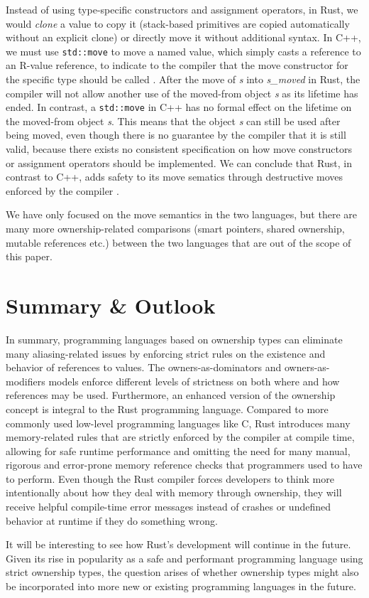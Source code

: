 \documentclass[sigplan,11pt,nonacm]{acmart}
\begin{document}
Instead of using type-specific constructors and assignment operators, in Rust, we would \emph{clone} a value to copy it (stack-based primitives are copied automatically without an explicit clone) or directly move it without additional syntax.
In C++, we must use \verb|std::move| to move a named value, which simply casts a reference to an R-value reference, to indicate to the compiler that the move constructor for the specific type should be called \cite{cpp-rust-ownership}.
After the move of \emph{s} into \emph{s\_moved} in Rust, the compiler will not allow another use of the moved-from object \emph{s} as its lifetime has ended.
In contrast, a \verb|std::move| in C++ has no formal effect on the lifetime on the moved-from object \emph{s}.
This means that the object \emph{s} can still be used after being moved, even though there is no guarantee by the compiler that it is still valid, because there exists no consistent specification on how move constructors or assignment operators should be implemented.
We can conclude that Rust, in contrast to C++, adds safety to its move sematics through destructive moves enforced by the compiler \cite{cpp-rust-ownership}.

We have only focused on the move semantics in the two languages, but there are many more ownership-related comparisons (smart pointers, shared ownership, mutable references etc.) between the two languages that are out of the scope of this paper.


\section{Summary \& Outlook}
\label{sec:summary}

In summary, programming languages based on ownership types can eliminate many aliasing-related issues by enforcing strict rules on the existence and behavior of references to values.
The owners-as-dominators and owners-as-modifiers models enforce different levels of strictness on both where and how references may be used.
Furthermore, an enhanced version of the ownership concept is integral to the Rust programming language.
Compared to more commonly used low-level programming languages like C, Rust introduces many memory-related rules that are strictly enforced by the compiler at compile time, allowing for safe runtime performance and omitting the need for many manual, rigorous and error-prone memory reference checks that programmers used to have to perform.
Even though the Rust compiler forces developers to think more intentionally about how they deal with memory through ownership, they will receive helpful compile-time error messages instead of crashes or undefined behavior at runtime if they do something wrong.

It will be interesting to see how Rust's development will continue in the future.
Given its rise in popularity as a safe and performant programming language using strict ownership types, the question arises of whether ownership types might also be incorporated into more new or existing programming languages in the future.



\end{document}
